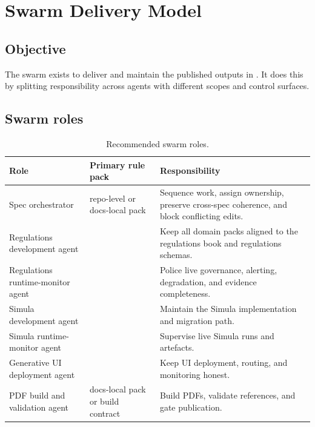 \chapter{Swarm Delivery Model}
\label{ch:swarm}

\section{Objective}

The swarm exists to deliver and maintain the published outputs in
. It does this by splitting responsibility
across agents with different scopes and control surfaces.

\section{Swarm roles}

\begin{table}[htbp]
\centering
\footnotesize
\caption{Recommended swarm roles.}
\label{tab:swarm-roles}
\begin{tabularx}{\textwidth}{@{}L{3.1cm}L{3.7cm}X@{}}
\toprule
\textbf{Role} & \textbf{Primary rule pack} & \textbf{Responsibility} \\
\midrule
Spec orchestrator & repo-level or docs-local pack & Sequence work, assign ownership, preserve cross-spec coherence, and block conflicting edits. \\
Regulations development agent &  & Keep all domain packs aligned to the regulations book and regulations schemas. \\
Regulations runtime-monitor agent &  & Police live governance, alerting, degradation, and evidence completeness. \\
Simula development agent &  & Maintain the Simula implementation and migration path. \\
Simula runtime-monitor agent &  & Supervise live Simula runs and artefacts. \\
Generative UI deployment agent &  & Keep UI deployment, routing, and monitoring honest. \\
PDF build and validation agent & docs-local pack or build contract & Build PDFs, validate references, and gate publication. \\
\bottomrule
\end{tabularx}
\end{table}

